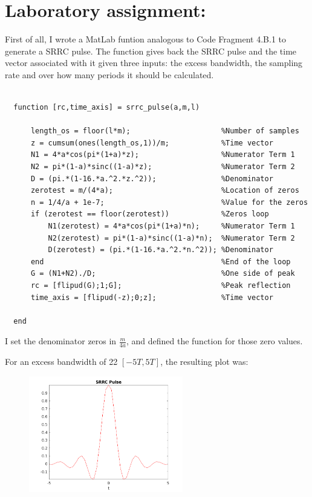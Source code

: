 \documentclass[a4paper,11pt]{article}
\begin{document}
\section{Laboratory assignment:}

First of all, I wrote a MatLab funtion  analogous to Code Fragment 4.B.1 to
generate a SRRC pulse. The function gives back the SRRC pulse and the time
vector associated with it given three inputs: the excess bandwidth, the sampling
rate and over how many periods it should be calculated.

\bigskip

\begin{lstlisting}

  function [rc,time_axis] = srrc_pulse(a,m,l)

      length_os = floor(l*m);                     %Number of samples
      z = cumsum(ones(length_os,1))/m;            %Time vector
      N1 = 4*a*cos(pi*(1+a)*z);                   %Numerator Term 1
      N2 = pi*(1-a)*sinc((1-a)*z);                %Numerator Term 2
      D = (pi.*(1-16.*a.^2.*z.^2));               %Denominator
      zerotest = m/(4*a);                         %Location of zeros
      n = 1/4/a + 1e-7;                           %Value for the zeros
      if (zerotest == floor(zerotest))            %Zeros loop
          N1(zerotest) = 4*a*cos(pi*(1+a)*n);     %Numerator Term 1
          N2(zerotest) = pi*(1-a)*sinc((1-a)*n);  %Numerator Term 2
          D(zerotest) = (pi.*(1-16.*a.^2.*n.^2)); %Denominator
      end                                         %End of the loop
      G = (N1+N2)./D;                             %One side of peak
      rc = [flipud(G);1;G];                       %Peak reflection
      time_axis = [flipud(-z);0;z];               %Time vector

  end

\end{lstlisting}

\bigskip

I set the denominator zeros in $\frac{m}{4a}$, and defined the function for
those zero values.

\newpage

For an excess bandwidth of 22%
$[-5T, 5T]$, the resulting plot was:

\begin{figure}[!hp]
    \begin{center}
      \includegraphics[width=0.6\textwidth]{images/exercise1.png}
    \end{center}
\end{figure}
\end{document}
